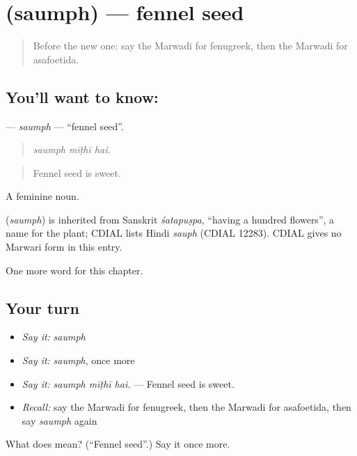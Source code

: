 \section[\texorpdfstring{\mw{सौंफ} (saumph)}{सौंफ (saumph)}]{ (saumph) — fennel seed}

\label{lesson:MW-C185-saumph}



\begin{quote}
Before the new one: say the Marwadi for fenugreek, then the Marwadi for asafoetida.
\end{quote}

\subsection*{You'll want to know: }
\textbf{} — \emph{saumph} — \textquotedblleft{}fennel seed\textquotedblright{}.

\begin{quote}
  
\end{quote}

\begin{quote}
\emph{saumph mīṭhī hai.}
\end{quote}

\begin{quote}
Fennel seed is sweet.
\end{quote}

A feminine noun.

\begin{cousinweb}
\textbf{} (\emph{saumph}) is inherited from Sanskrit \emph{śatapuṣpa}, \textquotedblleft{}having a hundred flowers\textquotedblright{}, a name for the plant; CDIAL lists Hindi \emph{sauph} (CDIAL 12283). CDIAL gives no Marwari form in this entry.
\end{cousinweb}

\begin{grammarlens}[title={What you've built}]
One more word for this chapter.
\end{grammarlens}

\subsection*{Your turn}
\begin{itemize}
\raggedright
  \item \emph{Say it:} \emph{saumph}
  \item \emph{Say it:} \emph{saumph}, once more
  \item \emph{Say it:} \emph{saumph mīṭhī hai.} — Fennel seed is sweet.
  \item \emph{Recall:} say the Marwadi for fenugreek, then the Marwadi for asafoetida, then say \emph{saumph} again
\end{itemize}

\begin{tcolorbox}[breakable,colback=teal!4,colframe=teal!35!black,title={Before you move on}]
What does  mean? (\textquotedblleft{}Fennel seed\textquotedblright{}.) Say it once more.
\end{tcolorbox}
